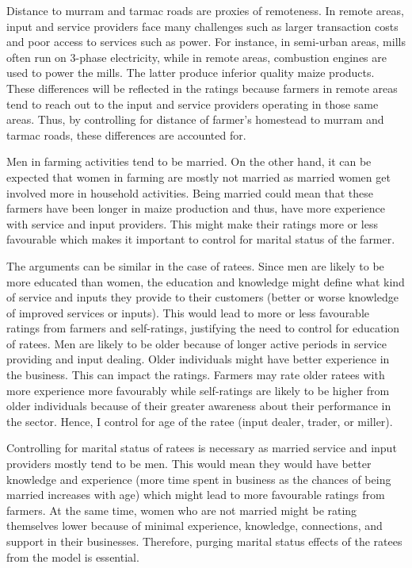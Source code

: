 \documentclass[12pt,english]{article}\usepackage[]{graphicx}\usepackage[]{color}
\begin{document}
Distance to murram and tarmac roads are proxies of remoteness. In
remote areas, input and service providers face many challenges such
as larger transaction costs and poor access to services such as power.
For instance, in semi-urban areas, mills often run on 3-phase electricity,
while in remote areas, combustion engines are used to power the mills.
The latter produce inferior quality maize products. These differences
will be reflected in the ratings because farmers in remote areas tend
to reach out to the input and service providers operating in those
same areas. Thus, by controlling for distance of farmer's homestead
to murram and tarmac roads, these differences are accounted for.

Men in farming activities tend to be married. On the other hand, it
can be expected that women in farming are mostly not married as married
women get involved more in household activities. Being married could
mean that these farmers have been longer in maize production and thus,
have more experience with service and input providers. This might
make their ratings more or less favourable which makes it important
to control for marital status of the farmer. 

The arguments can be similar in the case of ratees. Since men are
likely to be more educated than women, the education and knowledge
might define what kind of service and inputs they provide to their
customers (better or worse knowledge of improved services or inputs).
This would lead to more or less favourable ratings from farmers and
self-ratings, justifying the need to control for education of ratees.
Men are likely to be older because of longer active periods in service
providing and input dealing. Older individuals might have better experience
in the business. This can impact the ratings. Farmers may rate older
ratees with more experience more favourably while self-ratings are
likely to be higher from older individuals because of their greater
awareness about their performance in the sector. Hence, I control
for age of the ratee (input dealer, trader, or miller). 

Controlling for marital status of ratees is necessary as married service
and input providers mostly tend to be men. This would mean they would
have better knowledge and experience (more time spent in business
as the chances of being married increases with age) which might lead
to more favourable ratings from farmers. At the same time, women who
are not married might be rating themselves lower because of minimal
experience, knowledge, connections, and support in their businesses.
Therefore, purging marital status effects of the ratees from the model
is essential. 
\end{document}
